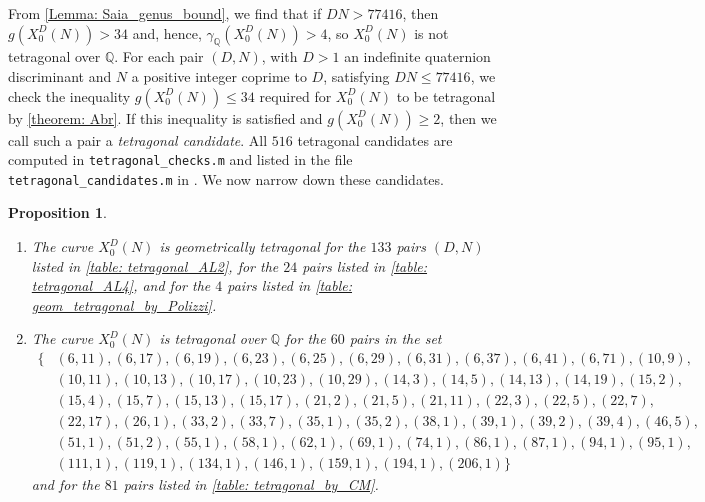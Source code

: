 \documentclass[11pt,reqno]{amsart}
\newcommand{\Q}{\mathbb{Q}}
\newtheorem{proposition}[theorem]{Proposition}
\theoremstyle{definition}
\begin{document}
From \cref{Lemma: Saia_genus_bound}, we find that if $DN > 77416$, then $g(X_0^D(N)) > 34$ and, hence, $\gamma_\Q(X_0^D(N)) > 4$, so $X_0^D(N)$ is not tetragonal over $\Q$. For each pair $(D,N)$, with $D>1$ an indefinite quaternion discriminant and $N$ a positive integer coprime to $D$, satisfying $DN \leq 77416$, we check the inequality $g(X_0^D(N)) \leq 34$ required for $X_0^D(N)$ to be tetragonal by \cref{theorem: Abr}. If this inequality is satisfied and $g(X_0^D(N)) \geq 2$, then we call such a pair a \emph{tetragonal candidate}. All $516$ tetragonal candidates are computed in \texttt{tetragonal{\_}checks.m} and listed in the file \texttt{tetragonal{\_}candidates.m} in \cite{MPSSRep}. We now narrow down these candidates.
\begin{proposition}\label{prop: tetragonal_sieving}
\phantom{a}
\begin{enumerate}
    \item The curve $X_0^D(N)$ is geometrically tetragonal for the $133$ pairs $(D,N)$ listed in \cref{table: tetragonal_AL2}, for the $24$ pairs listed in \cref{table: tetragonal_AL4}, and for the $4$ pairs listed in \cref{table: geom_tetragonal_by_Polizzi}. 
    \item The curve $X_0^D(N)$ is tetragonal over $\Q$ for the $60$ pairs in the set 
    \begin{align*} 
    \{ &( 6, 11 ),
    ( 6, 17 ),
    ( 6, 19 ),
    ( 6, 23 ),
    ( 6, 25 ),
    ( 6, 29 ),
     ( 6, 31 ),
    ( 6, 37 ),
    ( 6, 41 ),
    ( 6, 71 ),
    (10,9),
     \\
    &( 10, 11 ),
    ( 10, 13 ),
    ( 10, 17 ),
    ( 10, 23 ),
    ( 10, 29 ),
    ( 14, 3 ),
    ( 14, 5 ),
    ( 14, 13 ), 
    ( 14, 19 ),
    ( 15, 2 ), \\
    & ( 15, 4 ),
    ( 15, 7 ),
    ( 15, 13 ),
    ( 15, 17 ),
     ( 21, 2 ),
    ( 21, 5 ),
    ( 21, 11 ),
    ( 22, 3 ),
    ( 22, 5 ), 
     ( 22, 7 ),\\
    & ( 22, 17 ),
    ( 26, 1 ),
     ( 33, 2 ), 
    ( 33, 7 ),
    ( 35, 1 ),
     ( 35, 2 ),
    ( 38, 1 ),
    ( 39, 1 ),
    ( 39, 2 ),
    ( 39, 4 ), 
      ( 46, 5 ), \\
    &  ( 51, 1 ), 
    ( 51, 2),
    ( 55, 1 ),
    ( 58, 1 ),
    ( 62, 1 ),
    ( 69, 1 ),
    ( 74, 1 ), 
    ( 86, 1 ),
    ( 87, 1 ),
    ( 94, 1 ),
    ( 95, 1 ), \\
    & ( 111, 1 ),
    ( 119, 1 ),
    ( 134, 1 ),
    ( 146, 1 ),
    ( 159, 1 ),
    ( 194, 1 ),
    ( 206, 1 ) \}
    \end{align*}
    and for the $81$ pairs listed in \cref{table: tetragonal_by_CM}.
    

\end{enumerate}
\end{proposition}
\end{document}
